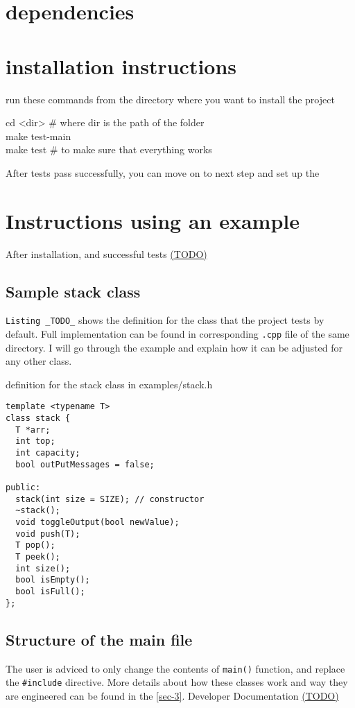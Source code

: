 \documentclass{elteikthesis}[2018/06/06]
\begin{document}
\section{dependencies}
\label{sec-2-2}
\section{installation instructions}
\label{sec-2-3}
run these commands from the directory where you want to install the project \\
\begin{listing}
cd <dir> \# where dir is the path of the folder \\

make test-main \\

make test \# to make sure that everything works \\
\end{listing}
After tests pass successfully, you can move on to next step and set up the \\
\section{Instructions using an example}
\label{sec-2-4}
After installation, and successful tests \uline{(TODO)} \\
\subsection{Sample stack  class}
\label{sec-2-4-1}
\texttt{Listing \_TODO\_} shows the definition for the class that the project tests by default. Full implementation can be found in corresponding \texttt{.cpp} file of the same directory. I will go through the example and explain how it can be adjusted for any other class. \\
\begin{listing}
\caption{definition for the stack class in examples/stack.h}
\begin{verbatim}
template <typename T>
class stack {
  T *arr;
  int top;
  int capacity;
  bool outPutMessages = false;

public:
  stack(int size = SIZE); // constructor
  ~stack();
  void toggleOutput(bool newValue);
  void push(T);
  T pop();
  T peek();
  int size();
  bool isEmpty();
  bool isFull();
};
\end{verbatim}
\end{listing}

\subsection{Structure of the main file}
\label{sec-2-4-2}
The user is adviced to only change the contents of \texttt{main()} function, and replace the \texttt{\#include} directive. More details about how these classes work and way they are engineered can be found in the \ref{sec-3}. Developer Documentation \uline{(TODO)} \\
\end{document}
